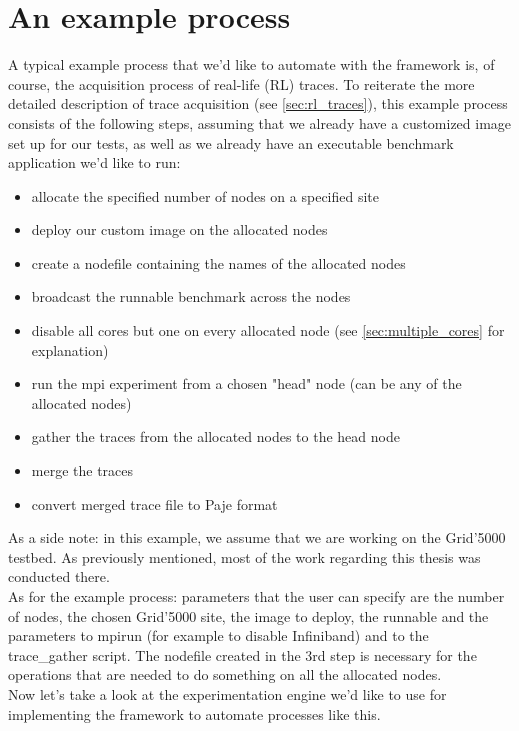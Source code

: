 \section{An example process}
\label{sec:example_process}
A typical example process that we'd like to automate with the
framework is, of course, the acquisition process of real-life (RL)
traces. To reiterate the more detailed description of trace
acquisition (see \ref{sec:rl_traces}), this example process consists
of the
following steps, assuming that we already have a customized image set
up for our tests, as well as we already have an executable benchmark
application we'd like to run:
\begin{itemize}
\item allocate the specified number of nodes on a specified site
\item deploy our custom image on the allocated nodes
\item create a nodefile containing the names of the allocated nodes
\item broadcast the runnable benchmark across the nodes
\item disable all cores but one on every allocated node (see
  \ref{sec:multiple_cores} for explanation)
\item run the mpi experiment from a chosen "head" node (can be any of
  the allocated nodes)
\item gather the traces from the allocated nodes to the head node
\item merge the traces
\item convert merged trace file to Paje format
\end{itemize}
As a side note: in this example, we assume that we are working on the
Grid'5000 testbed. As previously mentioned, most of the work regarding
this thesis was conducted there.\\
As for the example process: parameters that the user can specify
are the number of nodes, the chosen Grid'5000 site, the image to
deploy, the runnable and the parameters to mpirun (for example to
disable Infiniband) and to the trace\_gather script. The nodefile
created in the 3rd step is necessary for the operations that are
needed to do something on all the allocated nodes.\\
Now let's take a look at the experimentation engine we'd like to use
for implementing the framework to automate processes like this.
